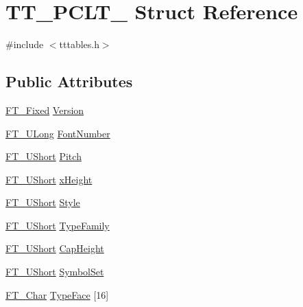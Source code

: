 \hypertarget{struct_t_t___p_c_l_t__}{\section{T\-T\-\_\-\-P\-C\-L\-T\-\_\- Struct Reference}
\label{struct_t_t___p_c_l_t__}
}


{\ttfamily \#include $<$tttables.\-h$>$}

\subsection*{Public Attributes}
\begin{DoxyCompactItemize}
\item 
\hyperlink{fttypes_8h_a5f5a679cc09f758efdd0d1c5feed3c3d}{F\-T\-\_\-\-Fixed} \hyperlink{struct_t_t___p_c_l_t___a83429ca782a731b38d67e604809e278c}{Version}
\item 
\hyperlink{fttypes_8h_a4fac88bdba78eb76b505efa6e4fbf3f5}{F\-T\-\_\-\-U\-Long} \hyperlink{struct_t_t___p_c_l_t___a1465aa1ea82df2be913eb64498fe3d94}{Font\-Number}
\item 
\hyperlink{fttypes_8h_a937f6c17cf5ffd09086d8610c37b9f58}{F\-T\-\_\-\-U\-Short} \hyperlink{struct_t_t___p_c_l_t___ae8134f929d7a259c081fe28e9b5cf53d}{Pitch}
\item 
\hyperlink{fttypes_8h_a937f6c17cf5ffd09086d8610c37b9f58}{F\-T\-\_\-\-U\-Short} \hyperlink{struct_t_t___p_c_l_t___a4b2f3e6bf6508eacbff5e4eb16745872}{x\-Height}
\item 
\hyperlink{fttypes_8h_a937f6c17cf5ffd09086d8610c37b9f58}{F\-T\-\_\-\-U\-Short} \hyperlink{struct_t_t___p_c_l_t___a8e99588c1d255e28aa3c59600d5ae7bd}{Style}
\item 
\hyperlink{fttypes_8h_a937f6c17cf5ffd09086d8610c37b9f58}{F\-T\-\_\-\-U\-Short} \hyperlink{struct_t_t___p_c_l_t___a9bb9ac1b782e03002ecb99de08af7935}{Type\-Family}
\item 
\hyperlink{fttypes_8h_a937f6c17cf5ffd09086d8610c37b9f58}{F\-T\-\_\-\-U\-Short} \hyperlink{struct_t_t___p_c_l_t___a754d840e5bcf6011459de635aa38d728}{Cap\-Height}
\item 
\hyperlink{fttypes_8h_a937f6c17cf5ffd09086d8610c37b9f58}{F\-T\-\_\-\-U\-Short} \hyperlink{struct_t_t___p_c_l_t___ad4eeb575ecd624d4540275981e96a336}{Symbol\-Set}
\item 
\hyperlink{fttypes_8h_a0f851552b050883885f0a0855771f39d}{F\-T\-\_\-\-Char} \hyperlink{struct_t_t___p_c_l_t___a47c2c6b276f3ab2002fe03af41dad396}{Type\-Face} \mbox{[}16\mbox{]}

\end{DoxyCompactItemize}
